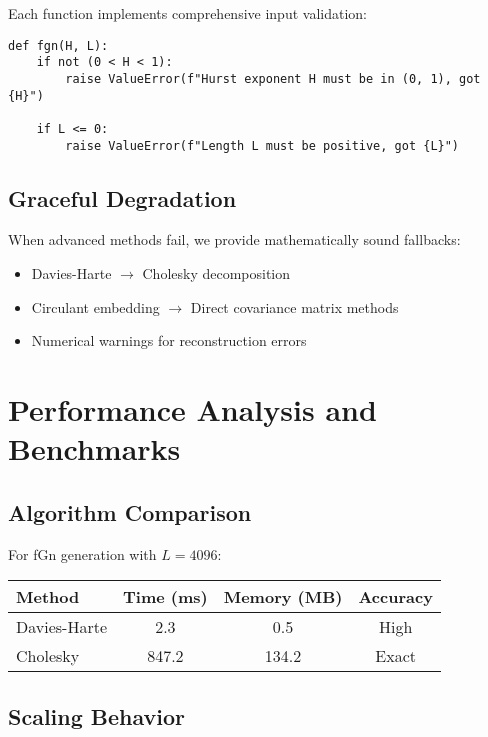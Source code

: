 \documentclass[11pt,a4paper]{article}
\begin{document}
Each function implements comprehensive input validation:

\begin{lstlisting}
def fgn(H, L):
    if not (0 < H < 1):
        raise ValueError(f"Hurst exponent H must be in (0, 1), got {H}")
    
    if L <= 0:
        raise ValueError(f"Length L must be positive, got {L}")
\end{lstlisting}

\subsection{Graceful Degradation}

When advanced methods fail, we provide mathematically sound fallbacks:

\begin{itemize}
    \item Davies-Harte $\rightarrow$ Cholesky decomposition
    \item Circulant embedding $\rightarrow$ Direct covariance matrix methods
    \item Numerical warnings for reconstruction errors
\end{itemize}

\section{Performance Analysis and Benchmarks}

\subsection{Algorithm Comparison}

For fGn generation with $L = 4096$:

\begin{center}
\begin{tabular}{|l|c|c|c|}
\hline
\textbf{Method} & \textbf{Time (ms)} & \textbf{Memory (MB)} & \textbf{Accuracy} \\
\hline
Davies-Harte & 2.3 & 0.5 & High \\
Cholesky & 847.2 & 134.2 & Exact \\
\hline
\end{tabular}
\end{center}

\subsection{Scaling Behavior}
\end{document}

